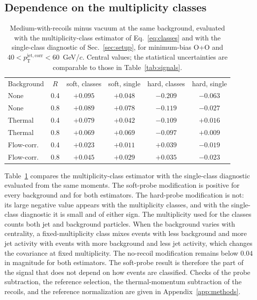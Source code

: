\documentclass[aps,prc,twocolumn,superscriptaddress,nofootinbib,longbibliography,floatfix,10pt]{revtex4-2}
\begin{document}
\subsection{Dependence on the multiplicity classes}\label{sec:estimator}
\begin{table}[t]
\caption{Medium-with-recoils minus vacuum at the same background, evaluated with the multiplicity-class estimator of Eq.~\eqref{eq:classes} and with the single-class diagnostic of Sec.~\ref{sec:setup}, for minimum-bias O+O and $40<p_{\mathrm T}^{\mathrm{jet,corr}}<60$~GeV/$c$. Central values; the statistical uncertainties are comparable to those in Table~\ref{tab:signals}.}
\label{tab:estimator}
\begin{ruledtabular}
\begin{tabular}{lccccc}
Background & $R$ & soft, classes & soft, single & hard, classes & hard, single\\
None & 0.4 & $+0.095$ & $+0.048$ & $-0.209$ & $-0.063$\\
None & 0.8 & $+0.089$ & $+0.078$ & $-0.119$ & $-0.027$\\
Thermal & 0.4 & $+0.079$ & $+0.042$ & $-0.109$ & $+0.016$\\
Thermal & 0.8 & $+0.069$ & $+0.069$ & $-0.097$ & $+0.009$\\
Flow-corr. & 0.4 & $+0.023$ & $+0.011$ & $+0.039$ & $-0.019$\\
Flow-corr. & 0.8 & $+0.045$ & $+0.029$ & $+0.035$ & $-0.023$
\end{tabular}
\end{ruledtabular}
\end{table}
Table~\ref{tab:estimator} compares the multiplicity-class estimator with the single-class diagnostic evaluated from the same moments. The soft-probe modification is positive for every background and for both estimators. The hard-probe modification is not: its large negative value appears with the multiplicity classes, and with the single-class diagnostic it is small and of either sign. The multiplicity used for the classes counts both jet and background particles. When the background varies with centrality, a fixed-multiplicity class mixes events with less background and more jet activity with events with more background and less jet activity, which changes the covariance at fixed multiplicity. The no-recoil modification remains below $0.04$ in magnitude for both estimators. The soft-probe result is therefore the part of the signal that does not depend on how events are classified. Checks of the probe subtraction, the reference selection, the thermal-momentum subtraction of the recoils, and the reference normalization are given in Appendix~\ref{app:methods}.
\end{document}
